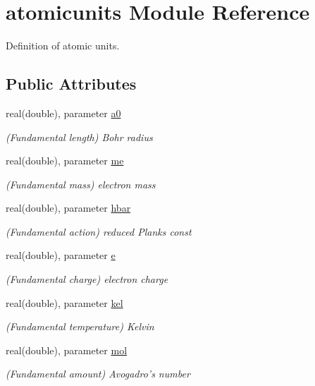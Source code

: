 \hypertarget{classatomicunits}{\section{atomicunits Module Reference}
\label{classatomicunits}
}


Definition of atomic units.  


\subsection*{Public Attributes}
\begin{DoxyCompactItemize}
\item 
real(double), parameter \hyperlink{classatomicunits_aa4859dbb9e7739ae603b78d9f2c58f93}{a0}
\begin{DoxyCompactList}\small\item\em (Fundamental length) Bohr radius \end{DoxyCompactList}\item 
real(double), parameter \hyperlink{classatomicunits_a02f36d49c4a56d1cc84c8cda6c631a68}{me}
\begin{DoxyCompactList}\small\item\em (Fundamental mass) electron mass \end{DoxyCompactList}\item 
real(double), parameter \hyperlink{classatomicunits_a7dffaade5d28d129a3726e8eff794447}{hbar}
\begin{DoxyCompactList}\small\item\em (Fundamental action) reduced Planks const \end{DoxyCompactList}\item 
real(double), parameter \hyperlink{classatomicunits_af3650eaf423c8af5e887256a5e8023d6}{e}
\begin{DoxyCompactList}\small\item\em (Fundamental charge) electron charge \end{DoxyCompactList}\item 
real(double), parameter \hyperlink{classatomicunits_a0b4d6ac453558bc86022587236f7d076}{kel}
\begin{DoxyCompactList}\small\item\em (Fundamental temperature) Kelvin \end{DoxyCompactList}\item 
real(double), parameter \hyperlink{classatomicunits_af00d60f8fc301784d6e48a53e524a4c8}{mol}
\begin{DoxyCompactList}\small\item\em (Fundamental amount) Avogadro's number \end{DoxyCompactList}\item 

\end{DoxyCompactItemize}
